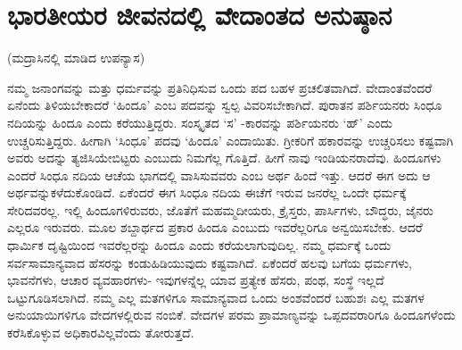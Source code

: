 
\chapter{ಭಾರತೀಯರ ಜೀವನದಲ್ಲಿ ವೇದಾಂತದ ಅನುಷ್ಠಾನ}

\begin{center}
(ಮದ್ರಾಸಿನಲ್ಲಿ ಮಾಡಿದ ಉಪನ್ಯಾಸ)
\end{center}

ನಮ್ಮ ಜನಾಂಗವನ್ನು ಮತ್ತು ಧರ್ಮವನ್ನು ಪ್ರತಿನಿಧಿಸುವ ಒಂದು ಪದ ಬಹಳ ಪ್ರಚಲಿತವಾಗಿದೆ. ವೇದಾಂತವೆಂದರೆ ಏನೆಂದು ತಿಳಿಯಬೇಕಾದರೆ ‘ಹಿಂದೂ’ ಎಂಬ ಪದವನ್ನು ಸ್ವಲ್ಪ ವಿವರಿಸಬೇಕಾಗಿದೆ. ಪುರಾತನ ಪರ್ಶಿಯನರು ಸಿಂಧೂ ನದಿಯನ್ನು ಹಿಂದೂ ಎಂದು ಕರೆಯುತ್ತಿದ್ದರು. ಸಂಸ್ಕೃತದ ‘ಸ’ -ಕಾರವನ್ನು ಪರ್ಶಿಯನರು ‘ಹ್​’ ಎಂದು ಉಚ್ಚರಿಸುತ್ತಿದ್ದರು. ಹೀಗಾಗಿ ‘ಸಿಂಧೂ’ ಪದವು ‘ಹಿಂದೂ’ ಎಂದಾಯಿತು. ಗ್ರೀಕರಿಗೆ ಹಕಾರವನ್ನು ಉಚ್ಚರಿಸಲು ಕಷ್ಟವಾಗಿ ಅವರು ಅದನ್ನು ತ್ಯಜಿಸಿಯೇಬಿಟ್ಟರು ಎಂಬುದು ನಿಮಗೆಲ್ಲ ಗೊತ್ತಿದೆ. ಹೀಗೆ ನಾವು ಇಂಡಿಯನರಾದೆವು. ಹಿಂದೂಗಳು ಎಂದರೆ ಸಿಂಧೂ ನದಿಯ ಆಚೆಯ ಭಾಗದಲ್ಲಿ ವಾಸಿಸುವವರು ಎಂಬ ಅರ್ಥ ಹಿಂದೆ ಇತ್ತು. ಆದರೆ ಈಗ ಅದು ಆ ಅರ್ಥವನ್ನುಕಳೆದುಕೊಂಡಿದೆ. ಏಕೆಂದರೆ ಈಗ ಸಿಂಧೂ ನದಿಯ ಈಚೆಗೆ ಇರುವ ಜನರೆಲ್ಲ ಒಂದೇ ಧರ್ಮಕ್ಕೆ ಸೇರಿದವರಲ್ಲ. ಇಲ್ಲಿ ಹಿಂದೂಗಳಿರುವರು, ಜೊತೆಗೆ ಮಹಮ್ಮದೀಯರು, ಕ್ರೈಸ್ತರು, ಪಾರ್ಸಿಗಳು, ಬೌದ್ಧರು, ಜೈನರು ಎಲ್ಲರೂ ಇರುವರು. ಮೂಲ ಶಬ್ದಾರ್ಥದ ಪ್ರಕಾರ ಹಿಂದೂ ಎಂಬುದು ಇವರೆಲ್ಲರಿಗೂ ಅನ್ವಯಿಸಬೇಕು. ಆದರೆ ಧಾರ್ಮಿಕ ದೃಷ್ಟಿಯಿಂದ ಇವರೆಲ್ಲರನ್ನು ಹಿಂದೂ ಎಂದು ಕರೆಯಲಾಗುವುದಿಲ್ಲ. ನಮ್ಮ ಧರ್ಮಕ್ಕೆ ಒಂದು ಸರ್ವಸಾಮಾನ್ಯವಾದ ಹೆಸರನ್ನು ಕಂಡುಹಿಡಿಯುವುದು ಕಷ್ಟವಾಗಿದೆ. ಏಕೆಂದರೆ ಹಲವು ಬಗೆಯ ಧರ್ಮಗಳು, ಭಾವನೆಗಳು, ಆಚಾರ ವ್ಯವಹಾರಗಳು- ಇವುಗಳನ್ನೆಲ್ಲ ಯಾವ ಪ್ರತ್ಯೇಕ ಹೆಸರು, ಪಂಥ, ಸಂಸ್ಥೆ ಇಲ್ಲದೆ ಒಟ್ಟುಗೂಡಿಸಲಾಗಿದೆ. ನಮ್ಮ ಎಲ್ಲ ಮತಗಳಿಗೂ ಸಾಮಾನ್ಯವಾದ ಒಂದು ಅಂಶವೆಂದರೆ ಬಹುಶಃ ಎಲ್ಲ ಮತಗಳ ಅನುಯಾಯಿಗಳಿಗೂ ವೇದಗಳಲ್ಲಿರುವ ನಂಬಿಕೆ. ವೇದಗಳ ಪರಮ ಪ್ರಾಮಾಣ್ಯವನ್ನು ಒಪ್ಪದವರಾರಿಗೂ ಹಿಂದೂಗಳೆಂದು ಕರೆಸಿಕೊಳ್ಳುವ ಅಧಿಕಾರವಿಲ್ಲವೆಂದು ತೋರುತ್ತದೆ.

